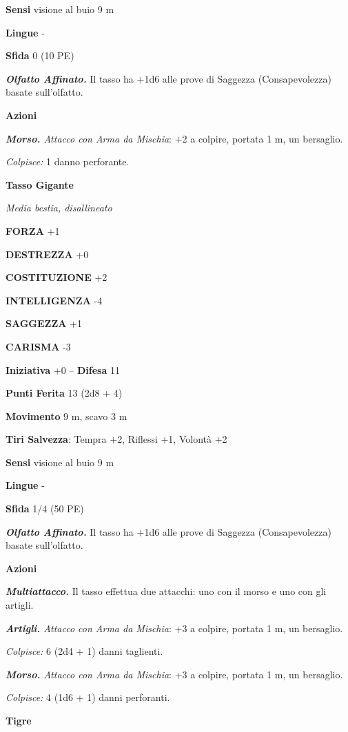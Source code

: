 \begin{multicols}{2}
\textbf{Sensi} visione al buio 9 m

\textbf{Lingue} -

\textbf{Sfida} 0 (10 PE)

\emph{\textbf{Olfatto Affinato.}} Il tasso ha +1d6 alle prove di Saggezza (Consapevolezza) basate sull'olfatto.

\textbf{Azioni}

\emph{\textbf{Morso.} Attacco con Arma da Mischia}: +2 a colpire, portata 1 m, un bersaglio.

\emph{Colpisce:} 1 danno perforante.

\medskip\textbf{Tasso Gigante}

\emph{Media bestia, disallineato}

\textbf{FORZA} +1

\textbf{DESTREZZA} +0

\textbf{COSTITUZIONE} +2

\textbf{INTELLIGENZA} -4

\textbf{SAGGEZZA} +1

\textbf{CARISMA} -3

\textbf{Iniziativa} +0 -- \textbf{Difesa} 11

\textbf{Punti Ferita} 13 (2d8 + 4)

\textbf{Movimento} 9 m, scavo 3 m

\textbf{Tiri Salvezza}: Tempra +2, Riflessi +1, Volontà +2

\textbf{Sensi} visione al buio 9 m

\textbf{Lingue} -

\textbf{Sfida} 1/4 (50 PE)

\emph{\textbf{Olfatto Affinato.}} Il tasso ha +1d6 alle prove di Saggezza (Consapevolezza) basate sull'olfatto.

\textbf{Azioni}

\emph{\textbf{Multiattacco.}} Il tasso effettua due attacchi: uno con il morso e uno con gli artigli.

\emph{\textbf{Artigli.} Attacco con Arma da Mischia}: +3 a colpire,  portata 1 m, un bersaglio.

\emph{Colpisce:} 6 (2d4 + 1) danni taglienti.

\emph{\textbf{Morso.} Attacco con Arma da Mischia}: +3 a colpire, portata 1 m, un bersaglio.

\emph{Colpisce:} 4 (1d6 + 1) danni perforanti.

\medskip\textbf{Tigre}


\end{multicols}
